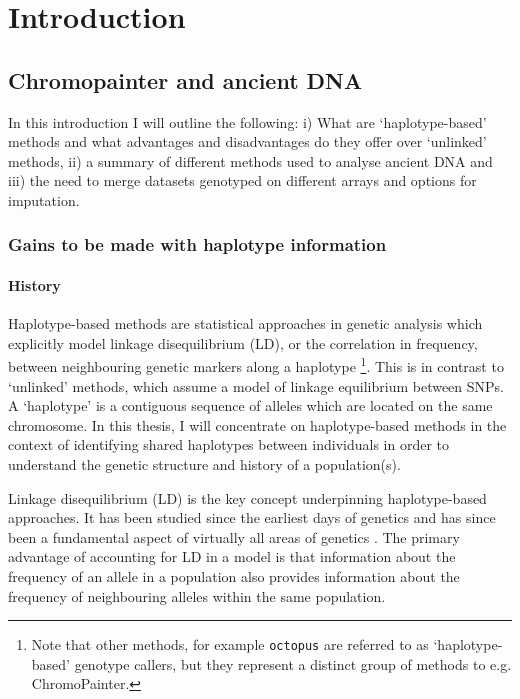 \chapter{Introduction}

\section{Chromopainter and ancient DNA}

In this introduction I will outline the following: i) What are `haplotype-based' methods and what advantages and disadvantages do they offer over `unlinked' methods, ii) a summary of different methods used to analyse ancient DNA and iii) the need to merge datasets genotyped on different arrays and options for imputation. 

\subsection{Gains to be made with haplotype information}

\subsubsection{History}

Haplotype-based methods are statistical approaches in genetic analysis which explicitly model linkage disequilibrium (LD), or the correlation in frequency, between neighbouring genetic markers along a haplotype \footnote{Note that other methods, for example \texttt{octopus} \cite{octopus} are referred to as `haplotype-based' genotype callers, but they represent a distinct group of methods to e.g. ChromoPainter.}. This is in contrast to `unlinked' methods, which assume a model of linkage equilibrium between SNPs. A `haplotype' is a contiguous sequence of alleles which are located on the same chromosome. In this thesis, I will concentrate on haplotype-based methods in the context of identifying shared haplotypes between individuals in order to understand the genetic structure and history of a population(s).    

Linkage disequilibrium (LD) is the key concept underpinning haplotype-based approaches. It has been studied since the earliest days of genetics \cite{morgan1912complete, bateson1902experiments} and has since been a fundamental aspect of virtually all areas of genetics \cite{slatkin2008linkage}. The primary advantage of accounting for LD in a model is that information about the frequency of an allele in a population also provides  information about the frequency of neighbouring alleles within the same population. 

